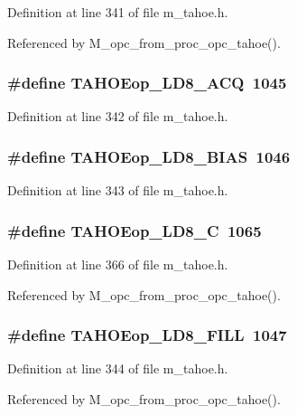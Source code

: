 Definition at line 341 of file m\_\-tahoe.h.

Referenced by M\_\-opc\_\-from\_\-proc\_\-opc\_\-tahoe().
\subsubsection{\setlength{\rightskip}{0pt plus 5cm}\#define TAHOEop\_\-LD8\_\-ACQ~1045}\label{m__tahoe_8h_450534a8197e02f26894fdc4265ef2ba}




Definition at line 342 of file m\_\-tahoe.h.
\subsubsection{\setlength{\rightskip}{0pt plus 5cm}\#define TAHOEop\_\-LD8\_\-BIAS~1046}\label{m__tahoe_8h_a50a69494bb1b8e5b9ede27eab1e228b}




Definition at line 343 of file m\_\-tahoe.h.
\subsubsection{\setlength{\rightskip}{0pt plus 5cm}\#define TAHOEop\_\-LD8\_\-C~1065}\label{m__tahoe_8h_edd779511874972789eb1f3309ceccf2}




Definition at line 366 of file m\_\-tahoe.h.

Referenced by M\_\-opc\_\-from\_\-proc\_\-opc\_\-tahoe().
\subsubsection{\setlength{\rightskip}{0pt plus 5cm}\#define TAHOEop\_\-LD8\_\-FILL~1047}\label{m__tahoe_8h_45d5302191110794f9dd6a85ac804c05}




Definition at line 344 of file m\_\-tahoe.h.

Referenced by M\_\-opc\_\-from\_\-proc\_\-opc\_\-tahoe().
